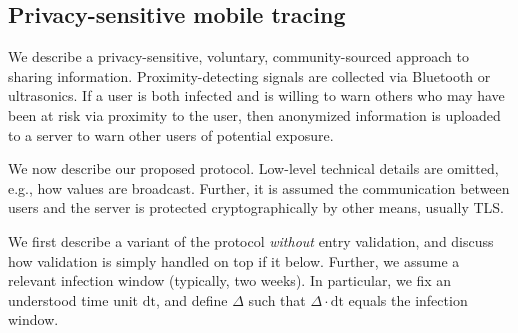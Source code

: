 \documentclass{article}
\begin{document}
\subsection{Privacy-sensitive mobile tracing} \label{sect:Bluetooth}

We describe a privacy-sensitive, voluntary, community-sourced approach to sharing information. 
Proximity-detecting signals are collected via Bluetooth or ultrasonics.  If a user is both infected and is willing to warn others who may have been at risk via proximity to the user, then anonymized information is uploaded to a server to warn other users of potential exposure. 


We now describe our proposed protocol. Low-level technical details are omitted, e.g., how values are broadcast. Further, it is assumed the communication between users and the server is protected cryptographically by other means, usually TLS. 


\newcommand{\id}{\mathrm{id}}
\newcommand{\dt}{\mathrm{dt}}
 We first describe a variant of the protocol {\em without} entry validation, and discuss how validation is simply handled on top if it below. Further, we assume a relevant infection window (typically, two weeks). In particular, we fix an understood time unit $\dt$, and define $\Delta$ such that $\Delta \cdot \dt$ equals the infection window.
\end{document}
